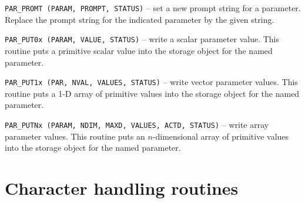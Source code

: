 \documentclass[twoside,11pt,nolof]{starlink}
\begin{document}
\begin{description}
\item\texttt{PAR\_PROMT (PARAM, PROMPT, STATUS)}
-- set a new prompt string for a parameter.
Replace the prompt string for the indicated parameter by the
given string.


\item\texttt{PAR\_PUT0x (PARAM, VALUE, STATUS)}
-- write a scalar parameter value.
This routine puts a primitive scalar value into the storage object
for the named parameter.



\item\texttt{PAR\_PUT1x (PAR, NVAL, VALUES, STATUS)}
-- write vector parameter values.
This routine puts a 1-D array of primitive values into the storage
object for the named parameter.


\item\texttt{PAR\_PUTNx (PARAM, NDIM, MAXD, VALUES, ACTD, STATUS)}
-- write array parameter values.
This routine puts an $n$-dimensional array of primitive values into
the storage object
for the named parameter.

\end{description}

\newpage
\section{Character handling routines\label{apxchar}}
\end{document}
